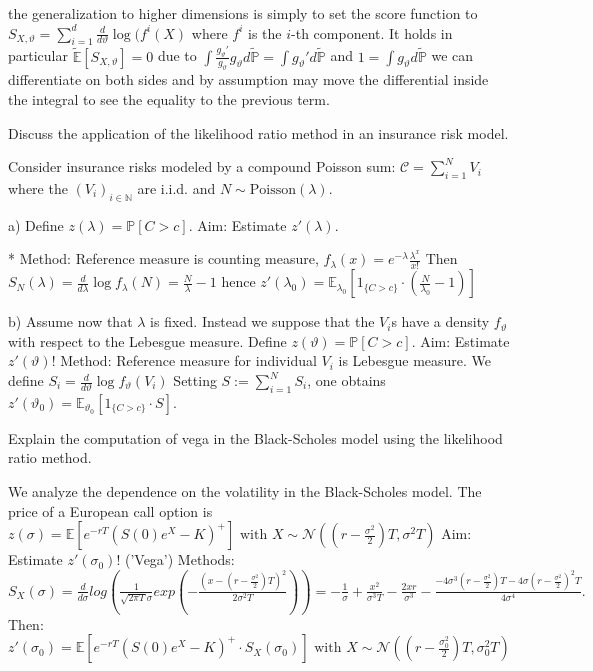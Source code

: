the generalization to higher dimensions is simply to set the score function to \( S_{X,\vartheta} = \sum_{i=1}^{d} \frac{d}{d\vartheta} \log(f^{i}(X) \)
where \( f^{i} \) is the \( i \)-th component.
It holds in particular \( \tilde{\mathbb{E}}[S_{X, \vartheta}] = 0 \) due to 
\( \int \frac{g_{\vartheta}'}{g_\vartheta} g_{\vartheta} d\tilde{\mathbb{P}} = \int g_{\vartheta}' d\tilde{\mathbb{P}} \)
and \( 1 = \int g_{\vartheta} d\tilde{\mathbb{P}} \) we can differentiate on both sides and by assumption may move the 
differential inside the integral to see the equality to the previous term.

Discuss the application of the likelihood ratio method in an insurance risk model.

Consider insurance risks modeled by a compound Poisson sum:
\( \mathcal{C} = \sum_{i=1}^{N} V_i\) where the \( (V_i)_{i \in \mathbb{N}} \) are i.i.d.
and \( N \sim \text{Poisson}(\lambda) \).

a) 
Define \( z(\lambda) = \mathbb{P}[C > c] \). Aim: Estimate \( z'(\lambda) \).

* Method: Reference measure is counting measure, 
\( f_{\lambda}(x) = e^{-\lambda} \frac{\lambda^x}{x!} \)
Then \( S_N(\lambda) = \frac{d}{d \lambda} \log f_{\lambda}(N) = \frac{N}{\lambda} - 1 \) 
hence \( z'(\lambda_0) = \mathbb{E}_{\lambda_0} [ 1_{\{C > c\}} \cdot (\frac{N}{\lambda_0} - 1) ] \)

b) 
Assume now that \(\lambda\) is fixed. Instead we suppose that the \(V_i\)s have a density \(f_{\vartheta}\) with respect to the Lebesgue measure.
Define \(z(\vartheta) = \mathbb{P}[C > c] \). Aim: Estimate \(z'(\vartheta)\)!
Method: Reference measure for individual \(V_i\) is Lebesgue measure. We define
\( S_i = \frac{d}{d \vartheta} \log f_{\vartheta}(V_i) \)
Setting \( S := \sum_{i=1}^N S_i \), one obtains \( z'(\vartheta_0) = \mathbb{E}_{\vartheta_0}[1_{\{C > c\}} \cdot S] \).

Explain the computation of vega in the Black-Scholes model using the likelihood
ratio method.

We analyze the dependence on the volatility in the Black-Scholes model.
The price of a European call option is
\( z(\sigma)=\mathbb{E}[e^{-rT}(S(0)e^{X}-K)^{+}] \text{ with } X\sim\mathcal{N}((r-\frac{\sigma^{2}}{2})T,\sigma^{2}T)\)
Aim: Estimate \( z'(\sigma_{0})! \) ('Vega')
Methods:
\( S_{X}(\sigma)=\frac{d}{d\sigma}log(\frac{1}{\sqrt{2\pi T}\sigma}exp(-\frac{(x-(r-\frac{\sigma^{2}}{2})T)^{2}}{2\sigma^{2}T}))=-\frac{1}{\sigma}+\frac{x^{2}}{\sigma^{3}T}-\frac{2xr}{\sigma^{3}}-\frac{-4\sigma^{3}(r-\frac{\sigma^{2}}{2})T-4\sigma(r-\frac{\sigma^{2}}{2})^{2}T}{4\sigma^{4}}.\)
Then:
\( z'(\sigma_{0})=\mathbb{E}[e^{-rT}(S(0)e^{X}-K)^{+}\cdot S_{X}(\sigma_{0})] \text{ with } X\sim\mathcal{N}((r-\frac{\sigma_{0}^{2}}{2})T,\sigma_{0}^{2}T) \)




